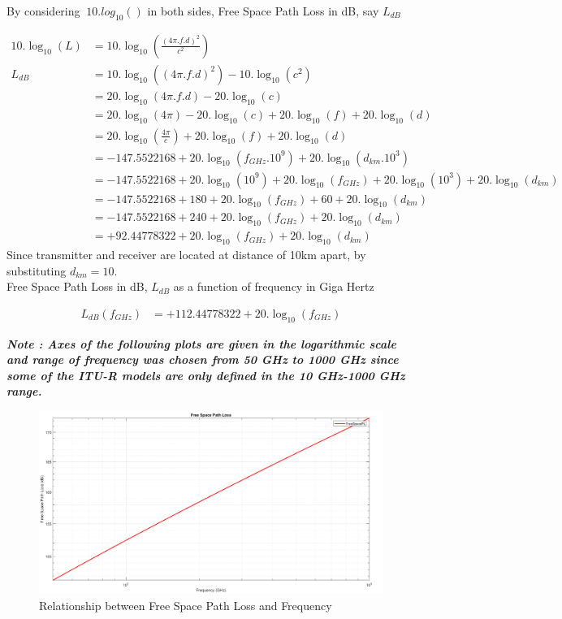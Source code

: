\documentclass[a4paper,11pt]{article}%
\begin{document}
By considering $\ 10.log_{10}()$ in both sides, Free Space Path Loss in dB, say $L_{dB}$

\[
\begin{split}
10.\log_{10}(L) &= 10.\log_{10}(\frac{(4\pi.f.d)^2}{c^2})\\
L_{dB}& = 10.\log_{10}((4\pi.f.d)^2) - 10.\log_{10}(c^2)\\
&=20.\log_{10}(4\pi.f.d)-20.\log_{10}(c)\\
&=20.\log_{10}(4\pi)-20.\log_{10}(c) + 20.\log_{10}(f) + 20.\log_{10}(d)\\
&=20.\log_{10}(\frac{4\pi}{c}) + 20.\log_{10}(f) + 20.\log_{10}(d)\\
&= -147.5522168 + 20.\log_{10}(f_{GHz}.10^9) + 20.\log_{10}(d_{km}.10^3)\\
& = -147.5522168 + 20.\log_{10}(10^9)+ 20.\log_{10}(f_{GHz}) + 20.\log_{10}(10^3) + 20.\log_{10}(d_{km})\\
&= -147.5522168 + 180+ 20.\log_{10}(f_{GHz}) + 60 + 20.\log_{10}(d_{km})\\
&= -147.5522168 + 240+ 20.\log_{10}(f_{GHz}) + 20.\log_{10}(d_{km})\\
&= +92.44778322+20.\log_{10}(f_{GHz}) + 20.\log_{10}(d_{km})
\end{split}
\]
Since transmitter and receiver are located at distance of 10km apart, by substituting $d_{km}= 10$.\\

Free Space Path Loss in dB, $L_{dB}$ as a function of frequency in Giga Hertz

\[
\begin{split}
L_{dB}(f_{GHz})&=  +112.44778322+20.\log_{10}(f_{GHz})
\end{split}
\]

\textbf{\textit{Note : Axes of the following plots are given in the logarithmic scale and range of frequency was chosen from 50 GHz to 1000 GHz since some of the ITU-R models are only defined in the 10 GHz-1000 GHz range.}}

\begin{figure}[!h]
	\centering
	\includegraphics[scale=0.35]{figures/FreeSpacePL.png}
	\caption{Relationship between Free Space Path Loss and Frequency}
\end{figure}
\end{document}
